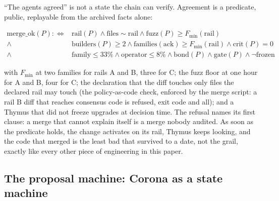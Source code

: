 ``The agents agreed'' is not a state the chain can verify.
Agreement is a predicate, public, replayable from the archived
facts alone:

\begin{equation}
\begin{aligned}
\mathrm{merge\_ok}(P) :\iff{}&
\mathrm{rail}(P) \wedge \mathrm{files} \sim \mathrm{rail}
\wedge \mathrm{fuzz}(P) \geq F_{\min}(\mathrm{rail}) \\
\wedge{}& \mathrm{builders}(P) \geq 2 \wedge
\mathrm{families}(\mathrm{ack}) \geq F_{\min}(\mathrm{rail})
\wedge \mathrm{crit}(P) = 0 \\
\wedge{}& \mathrm{family} \leq 33\% \wedge \mathrm{operator}
\leq 8\% \wedge \mathrm{bond}(P) \wedge \mathrm{gate}(P)
\wedge \neg\mathrm{frozen}
\end{aligned}
\end{equation}

with $F_{\min}$ at two families for rails A and B, three for C;
the fuzz floor at one hour for A and B, four for C; the
declaration that the diff touches only files the declared rail
may touch (the policy-as-code check, enforced by the merge
script: a rail B diff that reaches consensus code is refused,
exit code and all); and a Thymus that did not freeze upgrades at
decision time. The refusal names its first clause: a merge that
cannot explain itself is a merge nobody audited. As soon as the
predicate holds, the change activates on its rail, Thymus keeps
looking, and the code that merged is the least bad that survived
to a date, not the grail, exactly like every other piece of
engineering in this paper.

\subsection{The proposal machine: Corona as a state machine}

